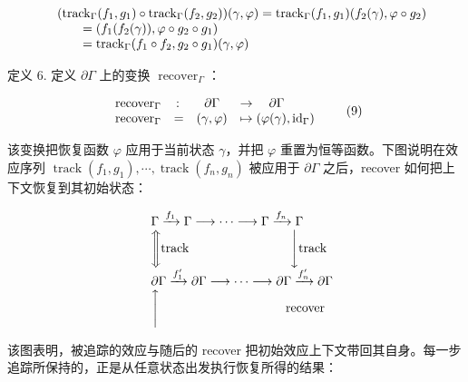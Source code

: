 \documentclass[
  10
]{article}
\begin{document}
\[
\begin{array} { r l }
  & ( \operatorname { t r a c k } _ { \Gamma } ( f _ { 1 } , g _ { 1 } ) \circ \operatorname { t r a c k } _ { \Gamma } ( f _ { 2 } , g _ { 2 } ) ) ( \gamma , \varphi ) = \operatorname { t r a c k } _ { \Gamma } ( f _ { 1 } , g _ { 1 } ) ( f _ { 2 } ( \gamma ) , \varphi \circ g _ { 2 } ) \\
  & \qquad = ( f _ { 1 } ( f _ { 2 } ( \gamma ) ) , \varphi \circ g _ { 2 } \circ g _ { 1 } ) \\
  & \qquad = \operatorname { t r a c k } _ { \Gamma } ( f _ { 1 } \circ f _ { 2 } , g _ { 2 } \circ g _ { 1 } ) ( \gamma , \varphi )
\end{array}
\]

定义 6. 定义 \(\partial \Gamma\) 上的变换 \(\operatorname { r e c o v e r } _ { \Gamma }\)：

\[
\begin{array} { l r c l }
  { \operatorname { r e c o v e r } _ { \Gamma } } & { \colon } & { \partial \Gamma } & { \to \quad \partial \Gamma } \\
  { \operatorname { r e c o v e r } _ { \Gamma } } & { = } & { ( \gamma , \varphi ) } & { \mapsto ( \varphi ( \gamma ) , \mathrm { i d } _ { \Gamma } ) }
\end{array}\tag{9}
\]

该变换把恢复函数 \(\varphi\) 应用于当前状态 \(\gamma\)，并把 \(\varphi\) 重置为恒等函数。下图说明在效应序列
\(\operatorname { t r a c k } ( f _ { 1 } , g _ { 1 } ) , \cdots , \operatorname { t r a c k } ( f _ { n } , g _ { n } )\)
被应用于 \(\partial \Gamma\) 之后，recover 如何把上下文恢复到其初始状态：

\[
\begin{array} { r l }
  & \Gamma \xrightarrow { f _ { 1 } } \Gamma \longrightarrow \cdots \longrightarrow \Gamma \xrightarrow { f _ { n } } \Gamma \\
  & \Bigg \Updownarrow \mathrm { t r a c k } \qquad \qquad \qquad \qquad \Bigg \downarrow \mathrm { t r a c k } \\
  & \partial \Gamma \xrightarrow { f _ { 1 } ^ { \prime } } \partial \Gamma \longrightarrow \cdots \longrightarrow \partial \Gamma \xrightarrow { f _ { n } ^ { \prime } } \partial \Gamma \\
  & \Bigg \uparrow \qquad \qquad \qquad \qquad \qquad \mathrm { r e c o v e r }
\end{array}
\]

该图表明，被追踪的效应与随后的 recover 把初始效应上下文带回其自身。每一步追踪所保持的，正是从任意状态出发执行恢复所得的结果：
\end{document}
